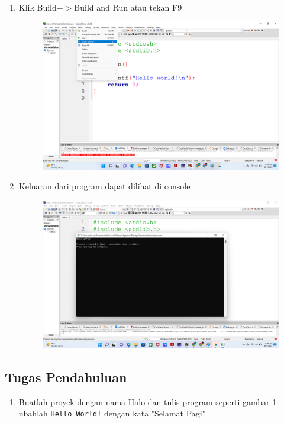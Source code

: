 \begin{enumerate}
\begin{figure}[H]
		      \caption{}
		      \label{fig:screenshot008}
	      \end{figure}
	\item Klik Build$->$Build and Run atau tekan F9
	      \begin{figure}[H]
		      \centering
		      \includegraphics[width=0.7\linewidth]{P1/img/screenshot009.png}
		      \caption{}
		      \label{fig:screenshot009}
	      \end{figure}
	\item Keluaran dari program dapat dilihat di console
	      \begin{figure}[H]
		      \centering
		      \includegraphics[width=0.7\linewidth]{P1/img/screenshot010.png}
		      \caption{}
		      \label{fig:screenshot010}
	      \end{figure}
\end{enumerate}

\subsection{Tugas Pendahuluan}
\begin{enumerate}
	\item Buatlah proyek dengan nama Halo dan tulis program seperti gambar \ref{fig:screenshot008} ubahlah \verb|Hello World!| dengan kata "Selamat Pagi"
\end{enumerate}

